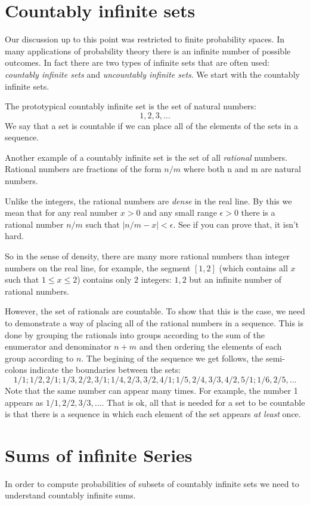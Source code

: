 \documentclass{report}
\theoremstyle{plain}
\theoremstyle{definition}
\begin{document}
\section{Countably infinite sets}

Our discussion up to this point was restricted to finite probability
spaces. In many applications of probability theory there is an
infinite number of possible outcomes. In fact there are two types of
infinite sets that are often used: {\em countably infinite sets} and 
{\em uncountably infinite sets}. We start with the countably infinite sets.

The prototypical countably infinite set is the set of natural numbers:
\[
1,2,3,\ldots
\]
We say that a set is countable if we can place all of the elements of
the sets in a sequence.

Another example of a countably infinite set is the set of all {\em
  rational} numbers. Rational numbers are fractions of the form $n/m$
where both n and m are natural numbers. 

Unlike the integers, the rational numbers are {\em dense} in the real
line. By this we mean that for any real number $x>0$ and any small range
$\epsilon>0$ there is a rational number $n/m$ such that 
$|n/m -x|<\epsilon$. See if you can prove that, it isn't hard. 

So in the sense of density, there are many more rational numbers than
integer numbers on the real line, for example, the segment $[1,2]$
(which contains all $x$ such that $1 \leq x \leq 2$) contains only $2$
integers: $1,2$ but an infinite number of rational numbers.

However, the set of rationals are countable. To show that this is the
case, we need to demonstrate a way of placing all of the rational
numbers in a sequence. This is done by grouping the rationals into
groups according to the sum of the enumerator and denominator $n+m$
and then ordering the elements of each group according to $n$. The
begining of the sequence we get follows, the semi-colons indicate the
boundaries between the sets:
\[
1/1;1/2,2/1;1/3,2/2,3/1;1/4,2/3,3/2,4/1;1/5,2/4,3/3,4/2,5/1;1/6,2/5,\ldots
\]
Note that the same number can appear many times. For example, the
number 1 appears as $1/1,2/2,3/3,\ldots$. That is ok, all that is
needed for a set to be countable is that there is a sequence in which
each element of the set appears {\em at least} once.

\section{Sums of infinite Series}
In order to compute probabilities of subsets of countably infinite
sets we need to understand countably infinite sums.
\end{document}

